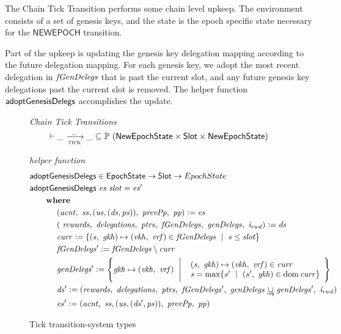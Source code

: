 The Chain Tick Transition performs some chain level
upkeep. The environment consists of a set of genesis keys, and the state is the
epoch specific state necessary for the $\mathsf{NEWEPOCH}$ transition.

Part of the upkeep is updating the genesis key delegation mapping
according to the future delegation mapping.
For each genesis key, we adopt the most recent delegation in $\mathit{fGenDelegs}$
that is past the current slot, and any future genesis key delegations past the current
slot is removed. The helper function $\mathsf{adoptGenesisDelegs}$ accomplishes the update.

\begin{figure}
  \emph{Chain Tick Transitions}
  \begin{equation*}
    \vdash \var{\_} \trans{tick}{\_} \var{\_} \subseteq
    \powerset (\NewEpochState \times \Slot \times \NewEpochState)
  \end{equation*}
  \caption{Tick transition-system types}
  \label{fig:ts-types:tick}
  \emph{helper function}
  \begin{align*}
      & \mathsf{adoptGenesisDelegs} \in \mathsf{EpochState} \to \mathsf{Slot} \to EpochState
      \\
      & \mathsf{adoptGenesisDelegs}~\mathit{es}~\mathit{slot} = \mathit{es'}
      \\
      & ~~~~~ ~ \mathbf{where}~ ~ 
      \\
      & ~~~~~~~~~~
      (\mathit{acnt},~\mathit{ss},(\mathit{us},(\mathit{ds},\mathit{ps})),~\mathit{prevPp},~\mathit{pp})
      \mathrel{\mathop:}=\mathit{es}
      \\
      & ~~~~~~~~~~
      (~\mathit{rewards},~\mathit{delegations},~\mathit{ptrs},
      ~\mathit{fGenDelegs},~\mathit{genDelegs},~\mathit{i_{rwd}})\mathrel{\mathop:}=\mathit{ds}
      \\
      & ~~~~~~~~~~\mathit{curr}\mathrel{\mathop:}=
        \{
          (\mathit{s},~\mathit{gkh})\mapsto(\mathit{vkh},~\mathit{vrf})\in\mathit{fGenDelegs}
          ~\mid~
          \mathit{s}\leq\mathit{slot}
        \}
      \\
      & ~~~~~~~~~~\mathit{fGenDelegs'}\mathrel{\mathop:}=
          \mathit{fGenDelegs}\setminus\mathit{curr}
      \\
      & ~~~~~~~~~~\mathit{genDelegs'}\mathrel{\mathop:}=
          \left\{
            \mathit{gkh}\mapsto(\mathit{vkh},~\mathit{vrf})
            ~\mathrel{\Bigg|}~
            {
              \begin{array}{l}
                (\mathit{s},~\mathit{gkh})\mapsto(\mathit{vkh},~\mathit{vrf})\in\mathit{curr}\\
                \mathit{s}=\max\{s'~\mid~(s',~\mathit{gkh})\in\operatorname{dom}{\mathit{curr}}\}
              \end{array}
            }
          \right\}
      \\
      & ~~~~~~~~~~\mathit{ds'}\mathrel{\mathop:}=
          (\mathit{rewards},~\mathit{delegations},~\mathit{ptrs},
          ~\mathit{fGenDelegs'},~\mathit{genDelegs}\mathbin{\underrightarrow\cup}\mathit{genDelegs'},~\mathit{i_{rwd}})
      \\
      & ~~~~~~~~~~\mathit{es'}\mathrel{\mathop:}=
      (\mathit{acnt},~\mathit{ss},(\mathit{us},(\mathit{ds'},\mathit{ps})),~\mathit{prevPp},~\mathit{pp})
  \end{align*}
\end{figure}

